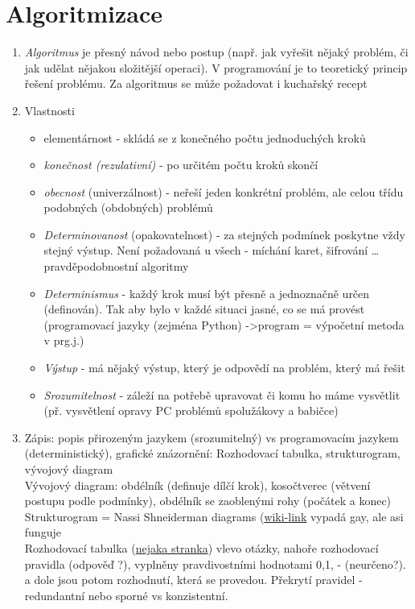 \documentclass[12pt]{article}
\begin{document}
\section{Algoritmizace}
\begin{enumerate}
\item \emph{Algoritmus} je přesný návod nebo postup (např. jak vyřešit nějaký problém, či jak udělat nějakou složitější operaci). V programování je to teoretický princip řešení problému. Za algoritmus se může požadovat i kuchařský recept
\item Vlastnosti
\begin{itemize}
\item elementárnost - skládá se z konečného počtu jednoduchých kroků
\item \emph{konečnost (rezulativní)} - po určitém počtu kroků skončí
\item \emph{obecnost} (univerzálnost) - neřeší jeden konkrétní problém, ale celou třídu podobných (obdobných) problémů
\item \emph{Determinovanost} (opakovatelnost) - za stejných podmínek poskytne vždy stejný výstup. Není požadovaná u všech - míchání karet, šifrování \dots pravděpodobnostní algoritmy
\item \emph{Determinismus} - každý krok musí být přesně a jednoznačně určen (definován). Tak aby bylo v každé situaci jasné, co se má provést (programovací jazyky (zejména Python) ->program = výpočetní metoda v prg.j.)
\item \emph{Výstup} - má nějaký výstup, který je odpovědí na problém, který má řešit
\item \emph{Srozumitelnost} - záleží na potřebě upravovat či komu ho máme vysvětlit (př. vysvětlení opravy PC problémů spolužákovy a babičce)
\end{itemize}
\item Zápis: popis přirozeným jazykem (srozumitelný) vs programovacím jazykem (deterministický), grafické znázornění: Rozhodovací tabulka, strukturogram, vývojový diagram\\
Vývojový diagram: obdélník (definuje dílčí krok), kosočtverec (větvení postupu podle podmínky), obdélník se zaoblenými rohy (počátek a konec)\\
Strukturogram = Nassi Shneiderman diagrams (\href{https://en.wikipedia.org/wiki/Nassi\%E2\%80\%93Shneiderman_diagram}{wiki-link} vypadá gay, ale asi funguje\\
Rozhodovací tabulka (\href{https://wikisofia.cz/wiki/Rozhodovac\%C3\%AD_tabulky_a_stromy}{nejaka stranka}) vlevo otázky, nahoře rozhodovací pravidla (odpověď ?), vyplněny pravdivostními hodnotami 0,1, - (neurčeno?). a dole jsou potom rozhodnutí, která se provedou. Překrytí pravidel - redundantní nebo sporné vs konzistentní.

\end{enumerate}
\end{document}
